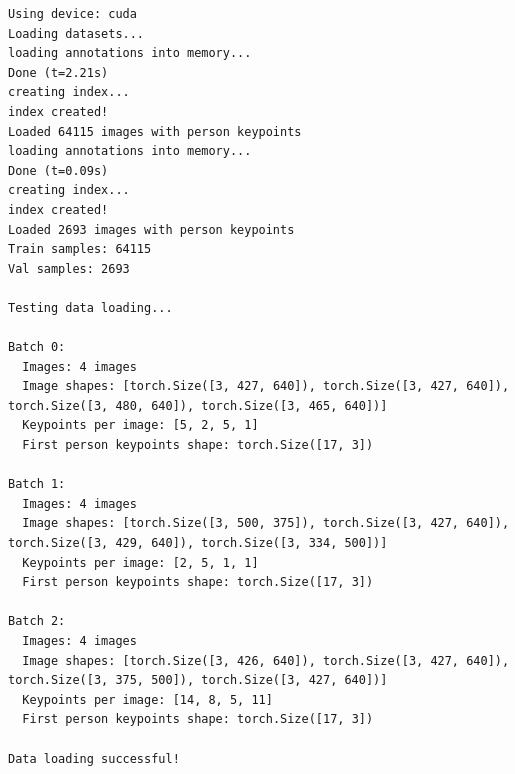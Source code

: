 \begin{lstlisting}[style=bashstyle,title={Main file basic output},label={code:basic_output}]
Using device: cuda
Loading datasets...
loading annotations into memory...
Done (t=2.21s)
creating index...
index created!
Loaded 64115 images with person keypoints
loading annotations into memory...
Done (t=0.09s)
creating index...
index created!
Loaded 2693 images with person keypoints
Train samples: 64115
Val samples: 2693

Testing data loading...

Batch 0:
  Images: 4 images
  Image shapes: [torch.Size([3, 427, 640]), torch.Size([3, 427, 640]), torch.Size([3, 480, 640]), torch.Size([3, 465, 640])]
  Keypoints per image: [5, 2, 5, 1]
  First person keypoints shape: torch.Size([17, 3])

Batch 1:
  Images: 4 images
  Image shapes: [torch.Size([3, 500, 375]), torch.Size([3, 427, 640]), torch.Size([3, 429, 640]), torch.Size([3, 334, 500])]
  Keypoints per image: [2, 5, 1, 1]
  First person keypoints shape: torch.Size([17, 3])

Batch 2:
  Images: 4 images
  Image shapes: [torch.Size([3, 426, 640]), torch.Size([3, 427, 640]), torch.Size([3, 375, 500]), torch.Size([3, 427, 640])]
  Keypoints per image: [14, 8, 5, 11]
  First person keypoints shape: torch.Size([17, 3])

Data loading successful!
\end{lstlisting}


